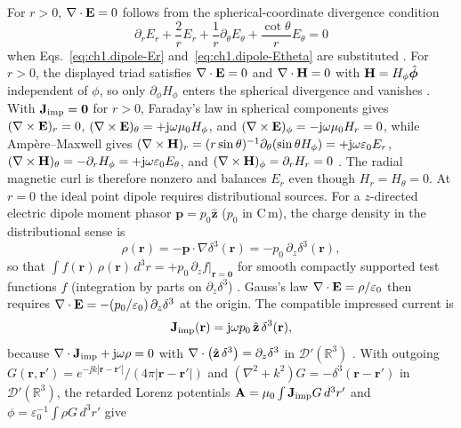 For $r>0$, $\nabla\cdot\mathbf{E}=0$ follows from the spherical-coordinate divergence condition
\[
\partial_r E_r+\frac{2}{r}E_r+\frac{1}{r}\partial_\theta E_\theta+\frac{\cot\theta}{r}E_\theta=0
\]
when Eqs.~\eqref{eq:ch1.dipole-Er} and~\eqref{eq:ch1.dipole-Etheta} are substituted \cite{stratton1941}. For $r>0$, the displayed triad satisfies $\nabla\cdot\mathbf{E}=0$ and $\nabla\cdot\mathbf{H}=0$ with $\mathbf{H}=H_\phi\hat{\boldsymbol\phi}$ independent of $\phi$, so only $\partial_\phi H_\phi$ enters the spherical divergence and vanishes \cite{stratton1941,harrington2001}. With $\mathbf{J}_{\mathrm{imp}}=\mathbf{0}$ for $r>0$, Faraday's law in spherical components gives $(\nabla\times\mathbf{E})_r=0$, $(\nabla\times\mathbf{E})_\theta=+\mathrm{j}\omega\mu_0 H_\phi$, and $(\nabla\times\mathbf{E})_\phi=-\mathrm{j}\omega\mu_0 H_r=0$, while Ampère--Maxwell gives $(\nabla\times\mathbf{H})_r=(r\sin\theta)^{-1}\partial_\theta(\sin\theta H_\phi)=+\mathrm{j}\omega\varepsilon_0 E_r$, $(\nabla\times\mathbf{H})_\theta=-\partial_r H_\phi=+\mathrm{j}\omega\varepsilon_0 E_\theta$, and $(\nabla\times\mathbf{H})_\phi=\partial_r H_r=0$ \cite{stratton1941,harrington2001}. The radial magnetic curl is therefore nonzero and balances $E_r$ even though $H_r=H_\theta=0$. At $r=0$ the ideal point dipole requires distributional sources. For a $z$-directed electric dipole moment phasor $\mathbf{p}=p_0\hat{\mathbf{z}}$ ($p_0$ in C\,m), the charge density in the distributional sense is
\begin{equation}
\label{eq:ch1.dipole-rho-distributional}
\rho(\mathbf{r})=-\mathbf{p}\cdot\nabla\delta^{3}(\mathbf{r})
=-p_0\,\partial_z\delta^{3}(\mathbf{r}),
\end{equation}
so that $\int f(\mathbf{r})\,\rho(\mathbf{r})\,d^{3}r=+p_0\,\partial_z f|_{\mathbf{r}=\mathbf{0}}$ for smooth compactly supported test functions $f$ (integration by parts on $\partial_z\delta^{3}$) \cite{jackson1999,stratton1941}. Gauss's law $\nabla\cdot\mathbf{E}=\rho/\varepsilon_0$ then requires $\nabla\cdot\mathbf{E}=-(p_0/\varepsilon_0)\,\partial_z\delta^{3}$ at the origin. The compatible impressed current is
\begin{equation}
\label{eq:ch1.dipole-Jimp-distributional}
\mathbf{J}_{\mathrm{imp}}(\mathbf{r})=\mathrm{j}\omega p_0\,\hat{\mathbf{z}}\,\delta^{3}(\mathbf{r}),
\end{equation}
because $\nabla\cdot\mathbf{J}_{\mathrm{imp}}+\mathrm{j}\omega\rho=0$ with $\nabla\cdot\big(\hat{\mathbf{z}}\,\delta^{3}\big)=\partial_z\delta^{3}$ in $\mathcal{D}'(\mathbb{R}^{3})$ \cite{jackson1999,stratton1941}. With outgoing $G(\mathbf{r},\mathbf{r}')=e^{-\jj k|\mathbf{r}-\mathbf{r}'|}/(4\pi|\mathbf{r}-\mathbf{r}'|)$ and $(\nabla^2+k^2)G=-\delta^{3}(\mathbf{r}-\mathbf{r}')$ in $\mathcal{D}'(\mathbb{R}^{3})$, the retarded Lorenz potentials $\mathbf{A}=\mu_0\int\mathbf{J}_{\mathrm{imp}} G\,d^3r'$ and $\phi=\varepsilon_0^{-1}\int\rho G\,d^3r'$ give

